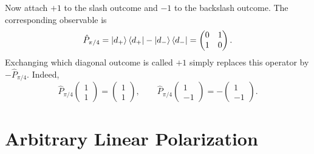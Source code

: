 Now attach \(+1\) to the slash outcome and \(-1\) to the backslash outcome.
The corresponding observable is
\begin{equation}
  \hat P_{\pi/4}
  =\left\lvert d_+\right\rangle\left\langle d_+\right\rvert-\left\lvert d_-\right\rangle\left\langle d_-\right\rvert
  =
  \begin{pmatrix}
    0&1\\
    1&0
  \end{pmatrix}.
  \label{eq:l6-P45}
\end{equation}
Exchanging which diagonal outcome is called \(+1\) simply replaces this
operator by \(-\hat P_{\pi/4}\).
Indeed,
\begin{equation}
  \hat P_{\pi/4}
  \begin{pmatrix}1\\1\end{pmatrix}
  =
  \begin{pmatrix}1\\1\end{pmatrix},
  \qquad
  \hat P_{\pi/4}
  \begin{pmatrix}1\\-1\end{pmatrix}
  =-
  \begin{pmatrix}1\\-1\end{pmatrix}.
  \label{eq:l6-P45-check}
\end{equation}

\begin{classroomqa}
\end{classroomqa}

\section{Arbitrary Linear Polarization}

